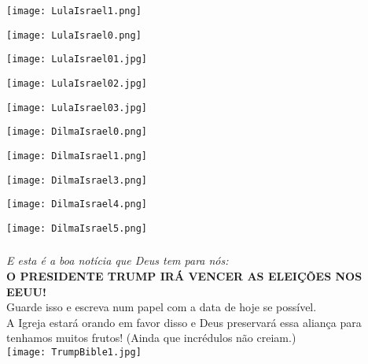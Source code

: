 \documentclass[aspectratio=169]{beamer}
\begin{document}
	
		\begin{frame}
	  \texttt{[image: LulaIsrael1.png]}
	\end{frame}
	
	\begin{frame}
	  \texttt{[image: LulaIsrael0.png]}
	\end{frame}
	
	\begin{frame}
\begin{center}
	  	  \texttt{[image: LulaIsrael01.jpg]}
	  \end{center}
	\end{frame}

	\begin{frame}
\begin{center}
	  	  \texttt{[image: LulaIsrael02.jpg]}
	  \end{center}
	\end{frame}

	\begin{frame}
\begin{center}
	  	  \texttt{[image: LulaIsrael03.jpg]}
	  \end{center}
	\end{frame}
	
		\begin{frame}
	  \texttt{[image: DilmaIsrael0.png]}
	\end{frame}
	
		\begin{frame}
	  \texttt{[image: DilmaIsrael1.png]}
	\end{frame}
	
			\begin{frame}
	  \texttt{[image: DilmaIsrael3.png]}
	\end{frame}
	
			\begin{frame}
	  \texttt{[image: DilmaIsrael4.png]}
	\end{frame}
	
			\begin{frame}
	  \texttt{[image: DilmaIsrael5.png]}
	\end{frame}
	

	\begin{frame}
	  \frametitle{}
	  \framesubtitle{}
	    \centering
	\textit{E esta é a boa notícia que Deus tem para nós:}\\
	\textbf{O PRESIDENTE TRUMP IRÁ VENCER AS ELEIÇÕES NOS EEUU!} \\
	Guarde isso e escreva num papel com a data de hoje se possível. \\ 
		\vspace{.5cm}
	A Igreja estará orando em favor disso e Deus preservará essa aliança para tenhamos muitos frutos! (Ainda que incrédulos não creiam.)\\
	\vspace{.5cm}
	\centering
          \texttt{[image: TrumpBible1.jpg]}	
	\end{frame}
\end{document}
